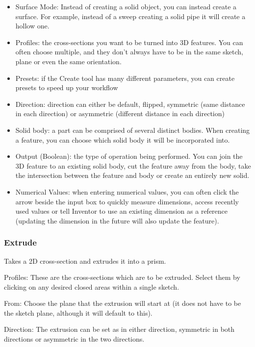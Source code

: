 \begin{itemize}

\item Surface Mode: Instead of creating a solid object, you can instead create a surface. For example, instead of a sweep creating a solid pipe it will create a hollow one.
\item Profiles: the cross-sections you want to be turned into 3D features. You can often choose multiple, and they don't always have to be in the same sketch, plane or even the same orientation.
\item Presets: if the Create tool has many different parameters, you can create presets to speed up your workflow
\item Direction: direction can either be default, flipped, symmetric (same distance in each direction) or asymmetric (different distance in each direction)
\item Solid body: a part can be comprised of several distinct bodies. When creating a feature, you can choose which solid body it will be incorporated into.
\item Output (Boolean): the type of operation being performed. You can join the 3D feature to an existing solid body, cut the feature away from the body, take the intersection between the feature and body or create an entirely new solid.
\item Numerical Values: when entering numerical values, you can often click the arrow beside the input box to quickly measure dimensions, access recently used values or tell Inventor to use an existing dimension as a reference (updating the dimension in the future will also update the feature).

\end{itemize}

\subsubsection{Extrude}
Takes a 2D cross-section and extrudes it into a prism. 

Profiles:
These are the cross-sections which are to be extruded. Select them by clicking on any desired closed areas within a single sketch.

From:
Choose the plane that the extrusion will start at (it does not have to be the sketch plane, although it will default to this).

Direction:
The extrusion can be set as in either direction, symmetric in both directions or asymmetric in the two directions.

